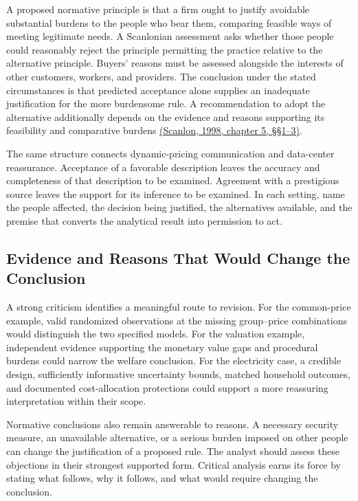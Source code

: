 A proposed normative principle is that a firm ought to justify avoidable
substantial burdens to the people who bear them, comparing feasible ways
of meeting legitimate needs. A Scanlonian assessment asks whether those
people could reasonably reject the principle permitting the practice
relative to the alternative principle. Buyers' reasons must be assessed
alongside the interests of other customers, workers, and providers. The
conclusion under the stated circumstances is that predicted acceptance
alone supplies an inadequate justification for the more burdensome rule.
A recommendation to adopt the alternative additionally depends on the
evidence and reasons supporting its feasibility and comparative burdens
\href{https://e-edu.nbu.bg/pluginfile.php/314831/mod_resource/content/0/scanlon_5.1-3.pdf}{(Scanlon,
1998, chapter 5, §§1--3)}.

The same structure connects dynamic-pricing communication and
data-center reassurance. Acceptance of a favorable description leaves
the accuracy and completeness of that description to be examined.
Agreement with a prestigious source leaves the support for its inference
to be examined. In each setting, name the people affected, the decision
being justified, the alternatives available, and the premise that
converts the analytical result into permission to act.

\hypertarget{M09-evidence-and-reasons-that-would-change-the-conclusion}{%
\subsection{Evidence and Reasons That Would Change the
Conclusion}\label{M09-evidence-and-reasons-that-would-change-the-conclusion}}

\noindent \noindent A strong criticism identifies a meaningful route to revision.
For the common-price example, valid randomized observations at the
missing group--price combinations would distinguish the two specified
models. For the valuation example, independent evidence supporting the
monetary value gaps and procedural burdens could narrow the welfare
conclusion. For the electricity case, a credible design, sufficiently
informative uncertainty bounds, matched household outcomes, and
documented cost-allocation protections could support a more reassuring
interpretation within their scope.

Normative conclusions also remain answerable to reasons. A necessary
security measure, an unavailable alternative, or a serious burden
imposed on other people can change the justification of a proposed rule.
The analyst should assess these objections in their strongest supported
form. Critical analysis earns its force by stating what follows, why it
follows, and what would require changing the conclusion.

